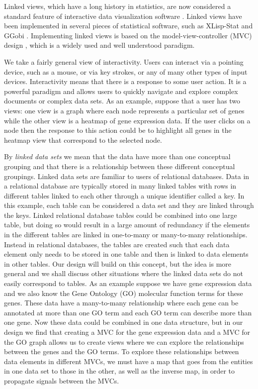 \documentclass[11pt]{article}
\begin{document}
Linked views, which have a long history in statistics, are now
considered a standard feature of interactive data visualization
software \cite{GGobi}.  Linked views have been implemented in several
pieces of statistical software, such as XLisp-Stat \cite{Lisp} and
GGobi \cite{GGobiMan}.  Implementing linked views is based on the
model-view-controller (MVC) design \cite{DesignPatterns}, which is a
widely used and well understood paradigm. 

We take a fairly general view of interactivity. Users can interact via
a pointing device, such as a mouse, or via key strokes, or any of many
other types of input devices.  Interactivity means that there is a
response to some user action.  It is a powerful paradigm and allows
users to quickly navigate and explore complex documents or complex
data sets.  As an example, suppose that a user has two views: one view
is a graph where each node represents a particular set of genes while
the other view is a heatmap of gene expression data.  If the user
clicks on a node then the response to this action could be to
highlight all genes in the heatmap view that correspond to the
selected node.

By \textit{linked data sets} we mean that the data have more than one
conceptual grouping and that there is a relationship between these
different conceptual groupings.  Linked data sets are 
familiar to users of relational databases.  Data in a relational
database are typically stored in many linked tables with rows in
different tables linked to each other through a unique identifier
called a key.  In this example, each table can be considered a data set
and they are linked through the keys. 
Linked relational database tables could be combined into one
large table, but doing so would result in a large amount of redundancy if
the elements in the different tables are linked in one-to-many or many-to-many
relationships.  Instead in relational databases, the tables are created such
that each data element only needs to be stored in one table and then is linked
to data elements in other tables.  Our design will build on this
concept, but the idea is more general and we shall discuss other situations
where the linked data sets do not easily correspond to tables.  As an example
suppose we have gene expression data and we
also know the Gene Ontology (GO) molecular function terms for these genes. 
These data have a many-to-many relationship where each gene can be
annotated at more than one GO term and each GO term can describe more than one
gene.  Now these data could be combined in one data structure, but in
our design we find that creating a MVC for the gene expression data and a MVC
for the GO graph allows us to create views where we can explore the
relationships between the genes and the GO terms.  To explore these
relationships between data elements in different MVCs, we
must have a map that goes from the entities in one data set to those in the
other, as well as the inverse map, in order to propagate signals between the
MVCs.  
\end{document}

